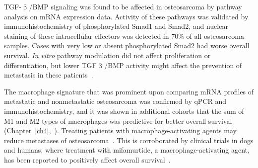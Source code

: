 TGF-$\upbeta$/BMP signaling was found to be affected in osteosarcoma
by pathway analysis on mRNA expression data. Activity
of these pathways was validated by immunohistochemistry of
phosphorylated Smad1 and Smad2, and nuclear staining of
these intracellular effectors was detected in 70\% of all osteosarcoma
samples. Cases with very low or absent phosphorylated
Smad2 had worse overall survival. {\it In vitro} pathway modulation
did not affect proliferation or differentiation, but lower TGF$\upbeta$/BMP
activity might affect the prevention of metastasis in
these patients~\cite{mohseny2012activities}.

The macrophage signature that was prominent upon comparing
mRNA profiles of metastatic and nonmetastatic osteosarcoma
was confirmed by qPCR and immunohistochemistry,
and it was shown in additional cohorts that the sum of M1
and M2 types of macrophages was predictive for better overall
survival (Chapter~\ref{ch4},~\cite{buddingh2011tumor}). Treating patients with macrophage\hyp{}activating
agents may reduce metastases of osteosarcoma~\cite{cleton2012immunotherapy}. This is corroborated
by clinical trials in dogs and humans, where treatment
with mifamurtide, a macrophage\hyp{}activating agent, has
been reported to positively affect overall survival~\cite{kurzman1995adjuvant,meyers2008osteosarcoma}.

%
